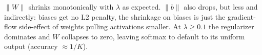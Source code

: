 \documentclass[10pt, a4paper]{article}
\begin{document}
\(\lVert W\rVert\) shrinks monotonically with \(\lambda\) as expected. \(\lVert b\rVert\) also drops, but less and indirectly: biases get no L2 penalty, the shrinkage on biases is just the gradient-flow side-effect of weights pulling activations smaller. At \(\lambda \ge 0.1\) the regularizer dominates and \(W\) collapses to zero, leaving softmax to default to its uniform output (accuracy \(\approx 1/K\)).
\end{document}
